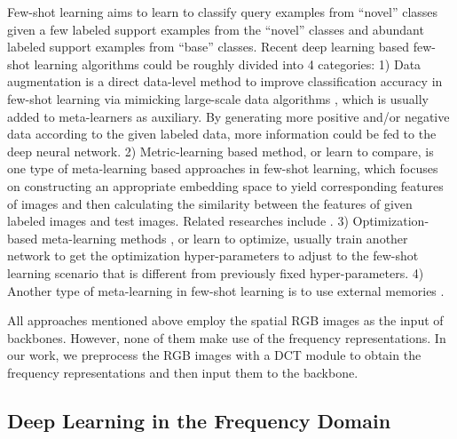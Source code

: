 \documentclass[10pt, conference, compsocconf]{IEEEtran}
\begin{document}
Few-shot learning aims to learn to classify query examples from \enquote{novel} classes given a few labeled support examples from the \enquote{novel} classes and abundant labeled support examples from \enquote{base} classes. Recent deep learning based few-shot learning algorithms could be roughly divided into 4 categories: 1) Data augmentation is a direct data-level method to improve classification accuracy in few-shot learning via mimicking large-scale data algorithms \cite{liu2019few,zhang2019few,chen2019image,wang2018low}, which is usually added to meta-learners as auxiliary.  By generating more positive and/or negative data according to the given labeled data, more information could be fed to the deep neural network. 2) Metric-learning based method, or learn to compare, is one type of meta-learning based approaches in few-shot learning,  which focuses on constructing an appropriate embedding space to yield corresponding features of images and then calculating the similarity between the features of given labeled images and test images.  Related researches include  \cite{li2019large,peng2019few,mangla2020charting,li2019few,vinyals2016matching,snell2017prototypical}.  3) Optimization-based meta-learning methods \cite{ravi2016optimization,finn2017model,nichol2018first}, or learn to optimize, usually train another network to get the optimization hyper-parameters to adjust to the few-shot learning scenario that is different from previously fixed hyper-parameters.  4) Another type of meta-learning in few-shot learning is to use external memories \cite{yoo2019coloring,santoro2016meta}.

All approaches mentioned above employ the spatial RGB images as the input of backbones. However, none of them make use of the frequency representations. In our work, we preprocess the RGB images with a DCT module to obtain the frequency representations and then input them to the backbone.

\subsection{Deep Learning in the Frequency Domain}
\end{document}
